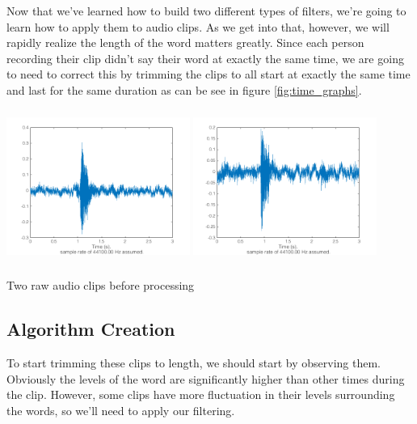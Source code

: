 \documentclass{tufte-handout}
\begin{document}
Now that we've learned how to build two different types of filters, we're going to learn how to apply them to audio clips. As we get into that, however, we will rapidly realize the length of the word matters greatly. Since each person recording their clip didn't say their word at exactly the same time, we are going to need to correct this by trimming the clips to all start at exactly the same time and last for the same duration as can be see in figure \ref{fig:time_graphs}.
\begin{marginfigure}
	\includegraphics[width = 6cm, height = 5cm]{time_1.png}
	\includegraphics[width = 6cm, height = 5cm]{time_2.png}
	\caption{Two raw audio clips before processing}
	\label{fig:time_graphs}
\end{marginfigure}

\subsection{Algorithm Creation}
To start trimming these clips to length, we should start by observing them. Obviously the levels of the word are significantly higher than other times during the clip. However, some clips have more fluctuation in their levels surrounding the words, so we'll need to apply our filtering.
\end{document}
